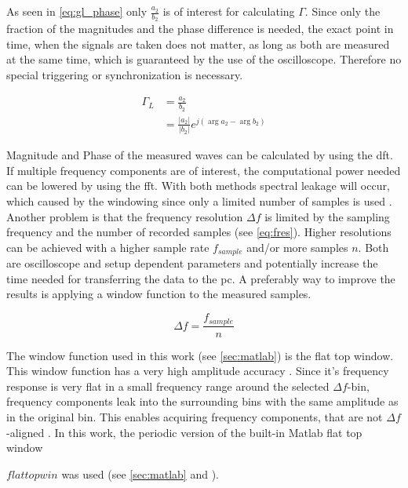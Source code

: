\documentclass[12pt,a4paper,parskip=full,abstract=true,BCOR=12mm,twoside,open=right]{scrreprt}
\providecommand{\abs}[1]{\lvert#1\rvert}
\newcommand*{\SavedLstInline}{}
\DeclareRobustCommand*{\lstinline}{%
  \ifmmode
    \let\SavedBGroup\bgroup
    \def\bgroup{%
      \let\bgroup\SavedBGroup
      \hbox\bgroup
    }%
  \fi
  \SavedLstInline
}
\begin{document}
As seen in \cref{eq:gl_phase} only $\frac{a_2}{b_2}$ is
of interest for calculating $\Gamma$. Since only the fraction of the magnitudes
and the phase difference is needed, the exact point in time, when the signals are
taken does not matter, as long as both are measured at the same time, which is guaranteed
by the use of the oscilloscope. Therefore no special triggering or synchronization is necessary.

\begin{equation}\label{eq:gl_phase}
    \begin{split}
        \Gamma_L & = \frac{a_2}{b_2} \\
                 & = \frac{\abs{a_2}}{\abs{b_2}} e^{j(\arg{a_2}-\arg{b_2})}
    \end{split}
\end{equation}

Magnitude and Phase of the measured waves can be calculated by using
the \gls{dft}. If multiple frequency components are of interest, the computational
power needed can be lowered by using the \gls{fft}. With both methods
spectral leakage will occur, which caused by the windowing since only a limited number of samples is used \cite{harris_use_1978}.
Another problem is that the frequency resolution $\Delta{}f$ is limited by the sampling
frequency and the number of recorded samples (see \cref{eq:fres}). Higher resolutions
can be achieved with a higher sample rate $f_{sample}$ and/or more samples $n$. Both are oscilloscope and setup
dependent parameters and potentially increase the time needed for transferring the data to the
\gls{pc}. A preferably way to improve the results is applying a window function to the
measured samples.

\begin{equation}
    \label{eq:fres} \Delta{}f = \frac{f_{sample}}{n}
\end{equation}

The window function used in this work (see \cref{sec:matlab}) is the flat top window.
This window function has a very high amplitude accuracy \cite{heinzel_spectrum_2002}.
Since it's frequency response is very flat in a small frequency range around the selected $\Delta{}f$-bin, frequency components leak
into the surrounding bins with the same amplitude as in the original bin. This enables acquiring frequency components, that are not $\Delta{}f$-aligned \cite{heinzel_spectrum_2002}.
In this work, the periodic version of the built-in Matlab flat top window \lstinline$flattopwin$
was used (see \cref{sec:matlab} and \cite{matlab_flattop}).
\end{document}
